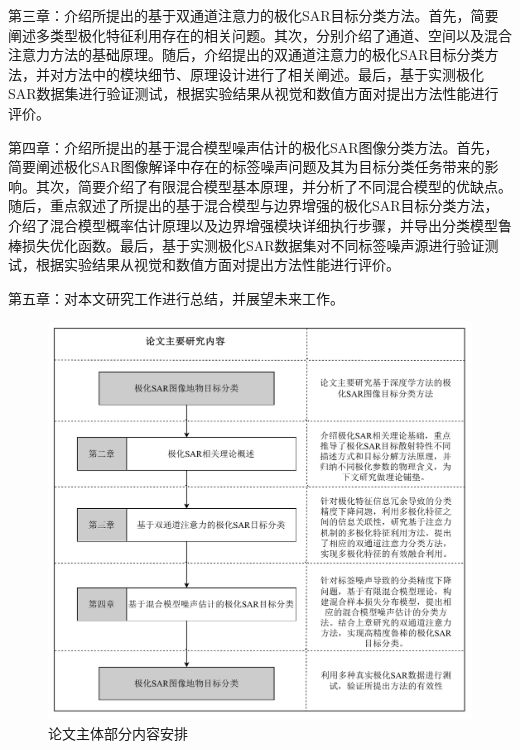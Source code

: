 第三章：介绍所提出的基于双通道注意力的极化SAR目标分类方法。首先，简要阐述多类型极化特征利用存在的相关问题。其次，分别介绍了通道、空间以及混合注意力方法的基础原理。随后，介绍提出的双通道注意力的极化SAR目标分类方法，并对方法中的模块细节、原理设计进行了相关阐述。最后，基于实测极化SAR数据集进行验证测试，根据实验结果从视觉和数值方面对提出方法性能进行评价。


第四章：介绍所提出的基于混合模型噪声估计的极化SAR图像分类方法。首先，简要阐述极化SAR图像解译中存在的标签噪声问题及其为目标分类任务带来的影响。其次，简要介绍了有限混合模型基本原理，并分析了不同混合模型的优缺点。随后，重点叙述了所提出的基于混合模型与边界增强的极化SAR目标分类方法，介绍了混合模型概率估计原理以及边界增强模块详细执行步骤，并导出分类模型鲁棒损失优化函数。最后，基于实测极化SAR数据集对不同标签噪声源进行验证测试，根据实验结果从视觉和数值方面对提出方法性能进行评价。



第五章：对本文研究工作进行总结，并展望未来工作。

\begin{figure}[ht!]
    \includegraphics[width=14cm]{pic/chapter1/论文结构安排.pdf}
    \caption{论文主体部分内容安排}
    \label{fig:论文主体部分内容安排}
\end{figure}
